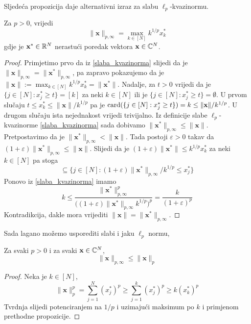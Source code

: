 \documentclass[a4paper,twoside,12pt]{memoir} %
\newcommand{\vect}[1]{\mathbf{#1}}
\renewcommand{\vec}{\vect}
\newcommand{\card}{\text{\normalfont{card}}}
\begin{document}
\noindent Sljede\'ca propozicija daje alternativni izraz za slabu $\ell_p$-kvazinormu.
\begin{prop}\label{slaba_kvazinorma_2}
    Za $p>0$, vrijedi
    \begin{equation*}
        \|\vec{x}\|_{p, \infty} = \max \limits_{k \in [N]}k^{1/p}x_k^{*}
    \end{equation*}
    gdje je $\vec{x}^* \in \R^N$ nerastu\'ci poredak vektora $\vec{x}\in \C^N$.
\end{prop}
\begin{proof}
    Primjetimo prvo da iz \eqref{slaba_kvazinorma} slijedi da je $\|\vec{x}\|_{p, \infty}=\|\vec{x}^*\|_{p, \infty}$, pa zapravo pokazujemo da je $\|\vec{x}\|:= \max_{k \in [N]}k^{1/p}x_k^* = \|\vec{x}^*\|$. Nadalje, za $t>0$ vrijedi da je $\{j \in [N]: x^*_j \geq t\}=[k]$ za neki $k \in [N]$ ili je $\{j \in [N]: x^*_j \geq t\}=\emptyset$. U prvom slu\v{c}aju $t \leq x^*_k \leq \|\vec{x}\|/k^{1/p}$ pa je $\card(\{j \in [N]:x_j^* \geq t \}) = k \leq \|\vec{x}\|/k^{1/p}$. U drugom slu\v{c}aju ista nejednakost vrijedi trivijalno. Iz definicije slabe $\ell_p$-kvazinorme \eqref{slaba_kvazinorma} sada dobivamo $\|\vec{x}^*\|_{p, \infty} \leq \|\vec{x}\|$. Pretpostavimo da je $\|\vec{x}^*\|_{p, \infty} < \|\vec{x}\|$. Tada postoji $\varepsilon > 0$ takav da $(1+ \varepsilon)\|\vec{x}^*\|_{p, \infty} \leq \|\vec{x}\|$. Slijedi da je $(1 + \varepsilon)\|\vec{x}^*\| \leq  k^{1/p}x^*_k$ za neki $k \in [N]$ pa stoga
    \begin{equation*}
        [k] \subseteq \big\{ j \in [N] : (1 + \varepsilon)\|\vec{x}^*\|_{p, \infty}/k^{1/p} \leq x_j^* \big\}
    \end{equation*}
    Ponovo iz \eqref{slaba_kvazinorma} imamo
    \begin{equation*}
        k \leq \frac{\|\vec{x}^*\|^p_{p, \infty}}{\big( (1 + \varepsilon)\|\vec{x}^*\|_{p, \infty}k^{1/p}\big)^p}=\frac{k}{(1 + \varepsilon)^p}
    \end{equation*}
    Kontradikcija, dakle mora vrijediti $\|\vec{x}\| = \|\vec{x}^*\|_{p, \infty}$.
\end{proof}
\noindent Sada lagano mo\v{z}emo usporediti slabi i jaku $\ell_p$ normu,
\begin{prop}
    Za svaki $p > 0$ i za svaki $\vec{x} \in \C^N$,
    \begin{equation*}
        \|\vec{x}\|_{p, \infty} \leq \|\vec{x}\|_p
    \end{equation*}
\end{prop}
\begin{proof}
    Neka je $k \in [N]$,
    \begin{equation*}
        \|\vec{x}\|_p^p = \sum_{j=1}^{N}(x_j^*)^p \geq \sum_{j=1}^{k}(x_j^*)^p \geq k(x_k^*)^p
    \end{equation*}
    Tvrdnja slijedi potenciranjem na $1/p$ i uzimaju\'ci maksimum po $k$ i primjenom prethodne propozicije.
\end{proof}
\end{document}
